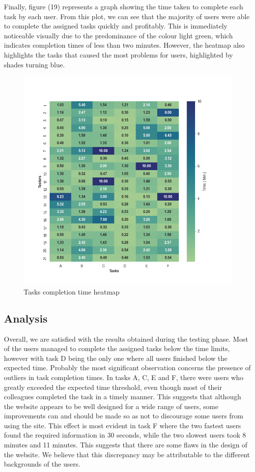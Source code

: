 \newpage
Finally, figure (19) represents a graph showing the time taken to complete each task by each user. 
From this plot, we can see that the majority of users were able to complete the assigned tasks quickly and profitably. 
This is immediately noticeable visually due to the predominance of the colour light green, which indicates completion times of less than two minutes. 
However, the heatmap also highlights the tasks that caused the most problems for users, highlighted by shades turning blue. 

\begin{figure}[htp!]
    \centering
    \includegraphics[scale=0.55]{Resources/Shared/taskstimePlot.png}
    \caption{Tasks completion time heatmap}
\end{figure}

\newpage
\subsection{Analysis}

Overall, we are satisfied with the results obtained during the testing phase. 
Most of the users managed to complete the assigned tasks below the time limits, however with task D being the only one where all users finished below the expected time.
Probably the most significant observation concerns the presence of outliers in task completion times. 
In tasks A, C, E and F, there were users who greatly exceeded the expected time threshold, even though most of their colleagues completed the task in a timely manner. 
This suggests that although the website appears to be well designed for a wide range of users, some improvements can and should be made so as not to discourage some users from using the site. 
This effect is most evident in task F where the two fastest users found the required information in 30 seconds, while the two slowest users took 8 minutes and 11 minutes. 
This suggests that there are some flaws in the design of the website. 
We believe that this discrepancy may be attributable to the different backgrounds of the users. 

